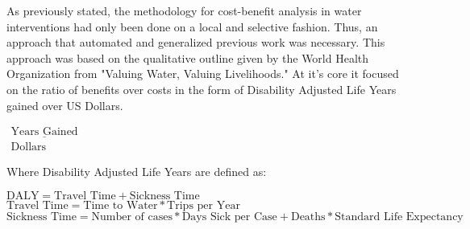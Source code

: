 As previously stated, the methodology for cost-benefit analysis in water interventions had only been done on a local and selective fashion.
Thus, an approach that automated and generalized previous work was necessary.
This approach was based on the qualitative outline given by the World Health Organization from "Valuing Water, Valuing Livelihoods."
At it's core it focused on the ratio of benefits over costs in the form of Disability Adjusted Life Years gained over US Dollars.
\\
\begin{center}
$\begin{matrix} \underline{\text{Years Gained}} \\ \text{Dollars} \end{matrix}$
\end{center}

Where Disability Adjusted Life Years are defined as:


\begin{center}
$\text{DALY} = \text{Travel Time} + \text{Sickness Time}$
\\
$\text{Travel Time} = \text{Time to Water} * \text{Trips per Year}$
\\
$\text{Sickness Time} = \text{Number of cases} * \text{Days Sick per Case} + \text{Deaths} * \text{Standard Life Expectancy}$
\end{center}